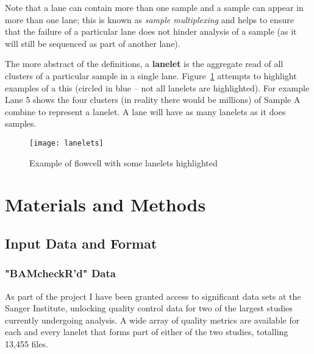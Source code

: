 Note that a lane can contain more than one sample and a sample can appear in
more than one lane; this is known as \textit{sample multiplexing} and helps to
ensure that the failure of a particular lane does not hinder analysis of a
sample (as it will still be sequenced as part of another lane).


The more abstract of the definitions, a \textbf{lanelet} is the aggregate read
of all clusters of a particular sample in a single lane.
Figure~\ref{fig:lanelets} attempts to highlight examples of a this (circled in
blue -- not all lanelets are highlighted). For example Lane 5 shows the four
clusters (in reality there would be millions) of Sample A combine to
represent a lanelet. A lane will have as many lanelets as it does samples.


\begin{figure}[htbp!]
    \centering
    \texttt{[image: lanelets]}
    \caption[lanelets]{Example of flowcell with some lanelets highlighted}
    \label{fig:lanelets}
\end{figure}


\chapter{Materials and Methods}
\section{Input Data and Format}
\subsection{"BAMcheckR'd" Data}
\label{chap:bamcheckr-data}

As part of the project I have been granted access to significant data sets at the
Sanger Institute, unlocking quality control data for two of the largest studies
currently undergoing analysis. A wide array of quality metrics are available for
each and every lanelet that forms part of either of the two studies, totalling
13,455 files.


